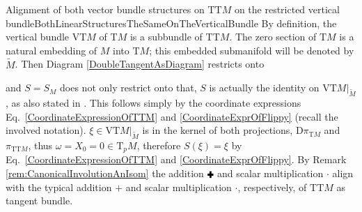 \documentclass[a4paper,oneside,11pt,bibliography=totoc]{scrartcl}
\def\RPlus{\ensuremath{\mathbin{\rule[.13em]{.66em}{.22em}\hspace{-.44em}\rule[-.08em]{.22em}{.66em}\,}}} %
\theoremstyle{plain}
\theoremstyle{remark}
\theoremstyle{definition}
\begin{document}
\begin{remarks}{Alignment of both vector bundle structures on $\mathrm{TT}M$ on the restricted vertical bundle}{BothLinearStructuresTheSameOnTheVerticalBundle}
By definition, the vertical bundle $\mathrm{VT}M$ of $\mathrm{T}M$ is a subbundle of $\mathrm{TT}M$. The zero section of $\mathrm{T}M$ is a natural embedding of $M$ into $\mathrm{T}M$; this embedded submanifold will be denoted by $\widetilde{M}$. Then Diagram \eqref{DoubleTangentAsDiagram} restricts onto
\begin{center}
\end{center} 
and $S=S_M$ does not only restrict onto that, $S$ is actually the identity on $\mathrm{VT}M|_{\widetilde{M}}$, as also stated in \cite[\S 9.6, Thm.\ 9.6.1, page 363; but without proof]{mackenzieGeneralTheory}. This follows simply by the coordinate expressions Eq.\ \eqref{CoordinateExpressionOfTTM} and \eqref{CoordinateExprOfFlippy} (recall the involved notation). $\xi \in \mathrm{VT}M|_{\widetilde{M}}$ is in the kernel of both projections, $\mathrm{D}\pi_{\mathrm{T}M}$ and $\pi_{\mathrm{TT}M}$, thus $\omega = X_0 = 0 \in \mathrm{T}_pM$, therefore $S(\xi) = \xi$ by Eq.\ \eqref{CoordinateExpressionOfTTM} and \eqref{CoordinateExprOfFlippy}. By Remark \ref{rem:CanonicalInvolutionAnIsom} the addition $\RPlus$ and scalar multiplication $\boldsymbol{\cdot}$ align with the typical addition $+$ and scalar multiplication $\cdot$, respectively, of $\mathrm{TT}M$ as tangent bundle.


\end{remarks}
\end{document}
